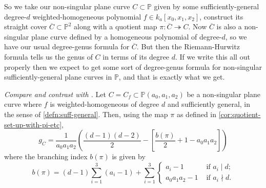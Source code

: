 \documentclass[10pt,notitlepage]{article}
\numberwithin{equation}{subsection}
\newcommand{\pee}{\mathbb{P}}
\newcommand{\cover}[1]{\overline{#1}}
\newcommand{\kathree}{k_a[x_0,x_1,x_2]}
\newcommand{\pathree}{\pee(a_0,a_1,a_2)}
\begin{document}
            So we take our non-singular plane curve $C\subset\pee$ given by some sufficiently-general degree-$d$ weighted-homogeneous polynomial $f\in\kathree$, construct its straight cover $\cover{C}\subset\pee^2$ along with a quotient map $\pi\colon\cover{C}\twoheadrightarrow C$.
            Now $\cover{C}$ is also a non-singular plane curve defined by a homogeneous polynomial of degree-$d$, so we have our usual degree-genus formula for $\cover{C}$.
            But then the Riemann-Hurwitz formula tells us the genus of $C$ in terms of its degree $d$.
            If we write this all out properly then we expect to get some sort of degree-genus formula for non-singular sufficiently-general plane curves in $\pee$, and that is exactly what we get.

            \begin{theorem}\label{thm:degree-genus}
                \emph{Compare and contrast with \cite[Theorem~12.2]{IanoFletcher:2015wc}.}
                Let $C=C_f\subset\pathree$ be a non-singular plane curve where $f$ is weighted-homogeneous of degree $d$ and sufficiently general, in the sense of \cref{defn:suff-general}.
                Then, using the map $\pi$ as defined in \cref{cor:quotient-set-up-with-pi-etc},
                \[
                    g_C = \frac{1}{a_0a_1a_2}\left(\frac{(d-1)(d-2)}{2}-\left[\frac{b(\pi)}{2}+1-a_0a_1a_2\right]\right)
                \]
                where the branching index $b(\pi)$ is given by
                \[
                    b(\pi) = (d-1)\sum_{i=1}^3 (a_i-1) + \sum_{i=1}^3
                    \begin{cases}
                        a_i-1 &\text{ if }a_i\mid d;\\
                        a_0a_1a_2-1&\text{ if }a_i\nmid d.
                    \end{cases}
                \]
            \end{theorem}
\end{document}
